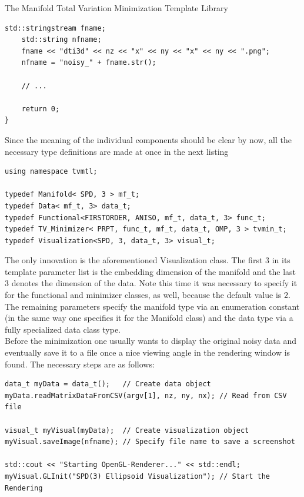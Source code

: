 \begin{chapter}{The Manifold Total Variation Minimization Template Library}
\begin{lstlisting}[label=code:tut3_init,caption={Initialization}]
    std::stringstream fname;
    std::string nfname;
    fname << "dti3d" << nz << "x" << ny << "x" << ny << ".png";
    nfname = "noisy_" + fname.str();
    
    // ...

    return 0;    
}
\end{lstlisting}
	
Since the meaning of the individual components should be clear by now, all the necessary type definitions 
are made at once in the next listing\\
\cppinline
\begin{lstlisting}[label=code:tut3_typdefinitions,caption={Type definitions, Visualization type}]
using namespace tvmtl;

typedef Manifold< SPD, 3 > mf_t;
typedef Data< mf_t, 3> data_t;
typedef Functional<FIRSTORDER, ANISO, mf_t, data_t, 3> func_t;
typedef TV_Minimizer< PRPT, func_t, mf_t, data_t, OMP, 3 > tvmin_t;
typedef Visualization<SPD, 3, data_t, 3> visual_t;
\end{lstlisting}

The only innovation is the aforementioned Visualization class. The first $3$ in its template parameter list is the embedding dimension of the manifold 
and the last $3$ denotes the dimension of the data. Note this time it was necessary to specify it for the functional and minimizer classes, as well, because the default value is $2$. 
The remaining parameters specify the manifold type via an enumeration constant (in the same way one specifies it for the Manifold class) and the data type via a fully
specialized data class type.\\
Before the minimization one usually wants to display the original noisy data and eventually save it to a file once a nice viewing angle in the rendering window is found.
The necessary steps are as follows:\\

\cppinline
\begin{lstlisting}[label=code:tut3_rendernoisyimg,caption={Data input and displaying the noisy data}]
data_t myData = data_t();   // Create data object
myData.readMatrixDataFromCSV(argv[1], nz, ny, nx); // Read from CSV file

visual_t myVisual(myData);  // Create visualization object
myVisual.saveImage(nfname); // Specify file name to save a screenshot

std::cout << "Starting OpenGL-Renderer..." << std::endl;
myVisual.GLInit("SPD(3) Ellipsoid Visualization"); // Start the Rendering
\end{lstlisting}


\end{chapter}
